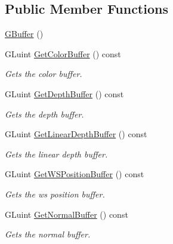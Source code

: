 \subsection*{Public Member Functions}
\begin{DoxyCompactItemize}
\item 
\hyperlink{class_g_buffer_a633b1c21ce5aed0c280ecb53efce7a05}{G\+Buffer} ()
\item 
G\+Luint \hyperlink{class_g_buffer_ab66bacfa4a41125ff8327313620a705b}{Get\+Color\+Buffer} () const 
\begin{DoxyCompactList}\small\item\em Gets the color buffer. \end{DoxyCompactList}\item 
G\+Luint \hyperlink{class_g_buffer_a231f4f5773c022efdd9bce552e110293}{Get\+Depth\+Buffer} () const 
\begin{DoxyCompactList}\small\item\em Gets the depth buffer. \end{DoxyCompactList}\item 
G\+Luint \hyperlink{class_g_buffer_a3b7e59d06fa58ae752e869fa62fabf4d}{Get\+Linear\+Depth\+Buffer} () const 
\begin{DoxyCompactList}\small\item\em Gets the linear depth buffer. \end{DoxyCompactList}\item 
G\+Luint \hyperlink{class_g_buffer_a83ec400b59b6f6e7c3e9a0ae6e3d669e}{Get\+W\+S\+Position\+Buffer} () const 
\begin{DoxyCompactList}\small\item\em Gets the ws position buffer. \end{DoxyCompactList}\item 
G\+Luint \hyperlink{class_g_buffer_a785bf9f70410c4762aa5570e1174ae1d}{Get\+Normal\+Buffer} () const 
\begin{DoxyCompactList}\small\item\em Gets the normal buffer. \end{DoxyCompactList}\end{DoxyCompactItemize}
